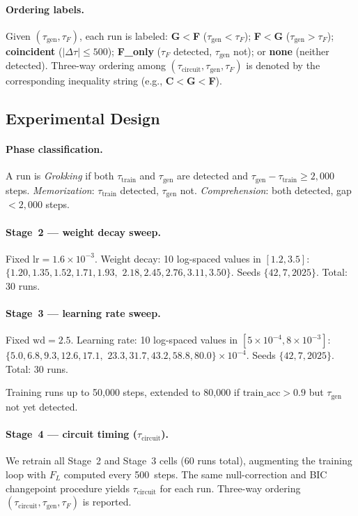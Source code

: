 \documentclass{article}
\newcommand{\taug}{\tau_{\mathrm{gen}}}
\newcommand{\tauf}{\tau_{F}}
\newcommand{\taucirc}{\tau_{\mathrm{circuit}}}
\newcommand{\Dtau}{\Delta\tau}
\newcommand{\flogit}{F_{L}}
\begin{document}
\paragraph{Ordering labels.}
Given $(\taug,\tauf)$, each run is labeled:
\textbf{G$<$F} ($\taug<\tauf$);
\textbf{F$<$G} ($\taug>\tauf$);
\textbf{coincident} ($|\Dtau|\leq500$);
\textbf{F\_only} ($\tauf$ detected, $\taug$ not);
or \textbf{none} (neither detected).
Three-way ordering among $(\taucirc, \taug, \tauf)$ is denoted by the
corresponding inequality string (e.g., \textbf{C$<$G$<$F}).

\subsection{Experimental Design}

\paragraph{Phase classification.}
A run is \textit{Grokking} if both $\tau_{\mathrm{train}}$ and
$\taug$ are detected and $\taug-\tau_{\mathrm{train}}\geq2{,}000$
steps. \textit{Memorization}: $\tau_{\mathrm{train}}$ detected,
$\taug$ not. \textit{Comprehension}: both detected,
gap $<2{,}000$ steps.

\paragraph{Stage~2 --- weight decay sweep.}
Fixed $\mathrm{lr}{=}1.6\times10^{-3}$.
Weight decay: 10 log-spaced values in $[1.2, 3.5]$:
$\{1.20, 1.35, 1.52, 1.71, 1.93,$
$2.18, 2.45, 2.76, 3.11, 3.50\}$.
Seeds $\{42,7,2025\}$. Total: 30 runs.

\paragraph{Stage~3 --- learning rate sweep.}
Fixed $\mathrm{wd}{=}2.5$.
Learning rate: 10 log-spaced values in $[5\times10^{-4},8\times10^{-3}]$:
$\{5.0, 6.8, 9.3, 12.6, 17.1,$
$23.3, 31.7, 43.2, 58.8, 80.0\}\times10^{-4}$.
Seeds $\{42,7,2025\}$. Total: 30 runs.

Training runs up to 50{,}000 steps, extended to 80{,}000 if
$\mathrm{train\_acc}>0.9$ but $\taug$ not yet detected.

\paragraph{Stage~4 --- circuit timing ($\taucirc$).}
We retrain all Stage~2 and Stage~3 cells (60 runs total), augmenting
the training loop with $\flogit$ computed every 500~steps.
The same null-correction and BIC changepoint procedure yields $\taucirc$
for each run.
Three-way ordering $(\taucirc, \taug, \tauf)$ is reported.
\end{document}
